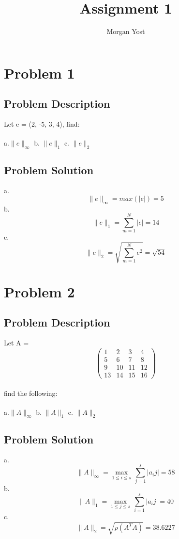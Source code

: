 \documentclass[titlepage]{article}
\author{Morgan Yost}
\title{Assignment 1}
\begin{document}
\maketitle          
\section{Problem 1}
\subsection{Problem Description}
Let e = (2, -5, 3, 4), find:\\\\
a.$\|e\|_\infty$ b. $\|e\|_1$ c. $\|e\|_2$
\subsection{Problem Solution}
a.\begin{equation*}
\|e\|_\infty = max(|e|) = 5
\end{equation*}
b. \begin{equation*}
\|e\|_1 = \sum_{m=1}^N |e| = 14
\end{equation*}
c. \begin{equation*}
\|e\|_2 = \sqrt{\sum_{m=1}^N e^2} = \sqrt{54}
\end{equation*}

\section{Problem 2}
\subsection{Problem Description}
Let A = \[ \left( \begin{array}{cccc}
1 & 2 & 3 & 4 \\
5 & 6 & 7 & 8 \\
9 & 10 & 11 & 12\\ 
13 & 14 & 15 & 16 \end{array} \right)\] \\
find the following: \\\\
a.$\|A\|_\infty$ b. $\|A\|_1$ c. $\|A\|_2$
\subsection{Problem Solution}
a.\begin{equation*}
\|A\|_\infty = \max_{1\leq i\leq s}\,\sum_{j=1}^s|a_ij| = 58
\end{equation*}
b. \begin{equation*}
\|A\|_1 = \max_{1\leq j\leq s}\,\sum_{i=1}^s|a_ij| = 40
\end{equation*}
c. \begin{equation*}
\|A\|_2 = \sqrt{\rho(A^T A)} = 38.6227
\end{equation*}
\end{document}
